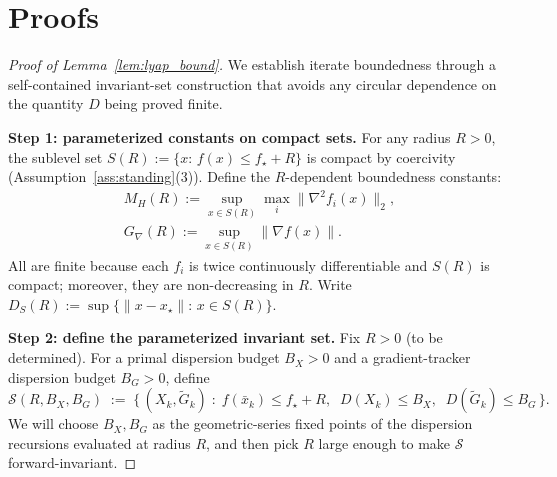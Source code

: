 \documentclass[review,onefignum,onetabnum]{siamart171218}
\begin{document}

\section{Proofs}\label{app:proofs}

\begin{proof}[Proof of Lemma~\ref{lem:lyap_bound}]
We establish iterate boundedness through a self-contained
invariant-set construction that avoids any circular dependence
on the quantity $D$ being proved finite.

\smallskip
\noindent\textbf{Step 1: parameterized constants on compact sets.}
For any radius $R>0$, the sublevel set
$S(R):=\{x:\,f(x)\le f_\star+R\}$
is compact by coercivity (Assumption~\ref{ass:standing}(3)).
Define the $R$-dependent boundedness constants:
\begin{gather*}
  M_H(R):=\sup_{x\in S(R)}\max_i\|\nabla^2 f_i(x)\|_2,\\
  G_\nabla(R):=\sup_{x\in S(R)}\|\nabla f(x)\|.
\end{gather*}
All are finite because each $f_i$ is twice continuously differentiable
and $S(R)$ is compact; moreover, they are non-decreasing in $R$.
Write $D_S(R):=\sup\{\|x-x_\star\|:\,x\in S(R)\}$.

\smallskip
\noindent\textbf{Step 2: define the parameterized invariant set.}
Fix $R>0$ (to be determined).
For a primal dispersion budget $B_X>0$ and a gradient-tracker
dispersion budget $B_G>0$, define
\[
  \mathcal S(R,B_X,B_G) \;:=\;
  \bigl\{\,(X_k,\tilde G_k)\;:\;
  f(\bar x_k)\le f_\star+R,\;\;
  D(X_k)\le B_X,\;\;
  D(\tilde G_k)\le B_G
  \,\bigr\}.
\]
We will choose $B_X,B_G$ as the geometric-series fixed points of the
dispersion recursions evaluated at radius $R$, and then pick $R$ large
enough to make $\mathcal S$ forward-invariant.


\end{proof}
\end{document}

